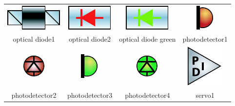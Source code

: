 \begin{table}
\begin{tabular}{|c|c|c|c|}
\includegraphics{contrib/optics_components/optical_diode1} & 
\includegraphics{contrib/optics_components/optical_diode2} &
\includegraphics{contrib/optics_components/optical_diode_green} &
\includegraphics{contrib/optics_components/photodetector1}\\
\tiny optical diode1 & 
\tiny optical diode2 &
\tiny optical diode green &
\tiny photodetector1\\
\hline

\includegraphics{contrib/optics_components/photodetector2} & 
\includegraphics{contrib/optics_components/photodetector3} & 
\includegraphics{contrib/optics_components/photodetector4} &
\includegraphics{contrib/optics_components/servo1}\\
\tiny photodetector2 & 
\tiny photodetector3 & 
\tiny photodetector4 &
\tiny servo1\\
\hline


\end{tabular}
\end{table}
